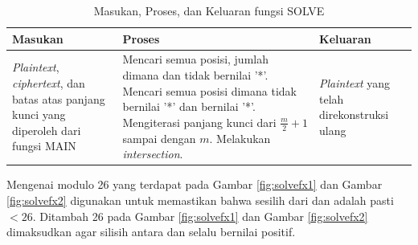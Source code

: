   \begin{table}[H]
	 	\caption{Masukan, Proses, dan Keluaran fungsi SOLVE}
		\begin{tabular}   {|p{2cm}|p{4.5cm}|p{2.5cm}|}\hline
		Masukan&Proses&Keluaran \\ \hline
		\textit{Plaintext}, \textit{ciphertext}, dan batas atas panjang kunci yang diperoleh dari fungsi MAIN&Mencari semua posisi, jumlah dimana \plaintext dan \ciphertext tidak bernilai '*'. Mencari semua posisi dimana \ciphertext tidak bernilai '*' dan \plaintext bernilai '*'. Mengiterasi panjang kunci dari $\frac{m}{2}+1$ sampai dengan $m$. Melakukan \textit{intersection}.  &\textit{Plaintext} yang telah direkonstruksi ulang \\ \hline
		\end{tabular}%
		\label{tab:iosolve}
	\end{table}

	Mengenai modulo 26 yang terdapat pada Gambar \ref{fig:solvefx1} dan Gambar \ref{fig:solvefx2} digunakan untuk memastikan bahwa sesilih dari \plaintext dan \ciphertext adalah pasti $< 26$. Ditambah 26 pada Gambar \ref{fig:solvefx1} dan Gambar \ref{fig:solvefx2} dimaksudkan agar silisih antara \plaintext dan \ciphertext selalu bernilai positif.  
  
